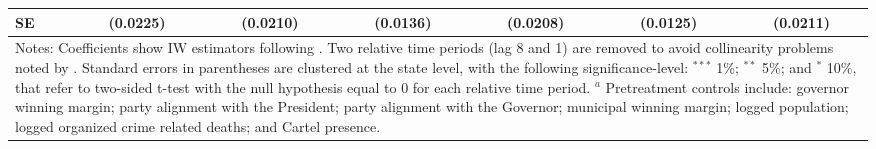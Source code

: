 \begin{landscape}
\begin{table}[htbp]
{\begin{tabular}{lcccccc}
SE       & (0.0225)  & (0.0210) & (0.0136)  & (0.0208)  & (0.0125)  & (0.0211)   \\
\hline \hline
\multicolumn{7}{p{1.4\textwidth}}{\footnotesize{Notes: Coefficients show IW estimators following \citet{abraham_sun_2020}. Two relative time periods (lag 8 and 1) are removed to avoid collinearity problems noted by \citet{abraham_sun_2020}. Standard errors in parentheses are clustered at the state level, with the following significance-level: $^{***}$ 1\%; $^{**}$ 5\%; and $^*$ 10\%, that refer to two-sided t-test with the null hypothesis equal to 0 for each relative time period. $^a$ Pretreatment controls include: governor winning margin; party alignment with the President;  party alignment with the Governor; municipal winning margin; logged population; logged organized crime related deaths; and Cartel presence.}} \\
\end{tabular}
}
\end{table}
\end{landscape}
